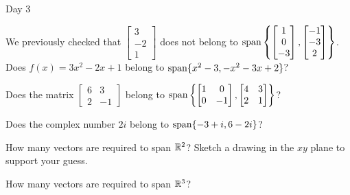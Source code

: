 \begin{applicationActivities}{Day 3}
\begin{activity}{5}
  We previously checked that \(\begin{bmatrix}3\\-2\\1\end{bmatrix}\)
  does not belong to
  \(\operatorname{span}\left\{\begin{bmatrix}1\\0\\-3\end{bmatrix},
  \begin{bmatrix}-1\\-3\\2\end{bmatrix}\right\}\).
  Does \(f(x)=3x^2-2x+1\) belong to
  \(\operatorname{span}\{x^2-3,-x^2-3x+2\}\)?
\end{activity}

\begin{activity}{10}
  Does the matrix \(\begin{bmatrix}6&3\\2&-1\end{bmatrix}\) belong to
  \(\operatorname{span}\left\{\begin{bmatrix}1&0\\0&-1\end{bmatrix},
  \begin{bmatrix}4&3\\2&1\end{bmatrix}\right\}\)?
\end{activity}

\begin{activity}{10}
  Does the complex number \(2i\) belong to
  \(\operatorname{span}\{-3+i,6-2i\}\)?
\end{activity}

\begin{activity}{10}
  How many vectors are required to span \(\mathbb{R}^2\)?
  Sketch a drawing in the \(xy\) plane to support your guess.
\end{activity}

\begin{activity}{5}
  How many vectors are required to span \(\mathbb{R}^3\)?
\end{activity}


\end{applicationActivities}
